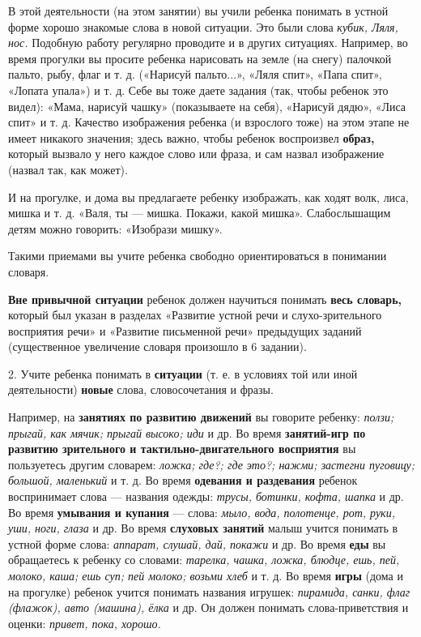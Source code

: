 \documentclass[a5paper]{book}
\renewcommand{\emph}[1]{\textit{#1}}
\begin{document}
В этой деятельности (на этом занятии) вы учили ребенка понимать в устной
форме хорошо знакомые слова в новой ситуации. Это были слова
\emph{кубик, Ляля, нос.} Подобную работу регулярно проводите и в других
ситуациях. Например, во время прогулки вы просите ребенка нарисовать на
земле (на снегу) палочкой пальто, рыбу, флаг и т. д. («Нарисуй
пальто...», «Ляля спит», «Папа спит», «Лопата упала») и т. д. Себе вы
тоже даете задания (так, чтобы ребенок это видел): «Мама, нарисуй чашку»
(показываете на себя), «Нарисуй дядю», «Лиса спит» и т. д. Качество
изображения ребенка (и взрослого тоже) на этом этапе не имеет никакого
значения; здесь важно, чтобы ребенок воспроизвел \textbf{образ,} который
вызвало у него каждое слово или фраза, и сам назвал изображение (назвал
так, как может).

И на прогулке, и дома вы предлагаете ребенку изображать, как ходят волк,
лиса, мишка и т. д. «Валя, ты --- мишка. Покажи, какой мишка».
Слабослышащим детям можно говорить: «Изобрази мишку».

Такими приемами вы учите ребенка свободно ориентироваться в понимании
словаря.

\textbf{Вне привычной ситуации} ребенок должен научиться понимать
\textbf{весь словарь,} который был указан в разделах «Развитие устной
речи и слухо-зрительного восприятия речи» и «Развитие письменной речи»
предыдущих заданий (существенное увеличение словаря произошло в 6
задании).

2. Учите ребенка понимать в \textbf{ситуации} (т. е. в условиях той или
иной деятельности) \textbf{новые} слова, словосочетания и фразы.

Например, на \textbf{занятиях по развитию движений} вы говорите ребенку:
\emph{ползи; прыгай, как мячик; прыгай высоко; иди} и др. Во время
\textbf{занятий-игр по развитию зрительного и тактильно-двигательного
восприятия} вы пользуетесь другим словарем: \emph{ложка; где?; где это?;
нажми; застегни пуговицу; большой, маленький} и т. д. Во время
\textbf{одевания и раздевания} ребенок воспринимает слова --- названия
одежды: \emph{трусы, ботинки, кофта, шапка} и др. Во время
\textbf{умывания и купания} --- слова: \emph{мыло, вода, полотенце, рот,
руки, уши, ноги, глаза} и др. Во время \textbf{слуховых занятий} малыш
учится понимать в устной форме слова: \emph{аппарат, слушай, дай,
покажи} и др. Во время \textbf{еды} вы обращаетесь к ребенку со словами:
\emph{тарелка, чашка, ложка, блюдце, ешь, пей, молоко, каша; ешь суп;
пей молоко; возьми хлеб} и т. д. Во время \textbf{игры} (дома и на
прогулке) ребенок учится понимать названия игрушек: \emph{пирамида,
санки, флаг (флажок), авто (машина), ёлка} и др. Он должен понимать
слова-приветствия и оценки: \emph{привет, пока, хорошо.}
\end{document}
